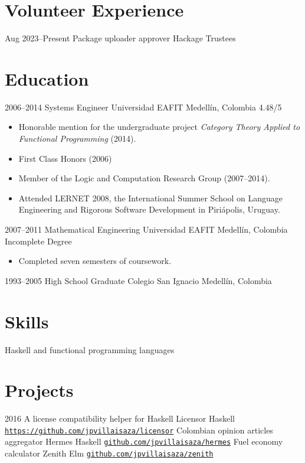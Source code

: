 \documentclass[letterpaper,sans,12pt]{moderncv}
\begin{document}
\section{Volunteer Experience}

\cventry
  {Aug 2023--Present}
  {Package uploader approver}
  {Hackage Trustees}
  {}
  {}
  {}

\section{Education}

\cventry
  {2006--2014}
  {Systems Engineer}
  {Universidad EAFIT}
  {Medellín, Colombia}
  {4.48/5}
  {
    \begin{itemize}
      \item
        Honorable mention for the undergraduate project \emph{Category
        Theory Applied to Functional Programming} (2014).
      \item
        First Class Honors (2006)
      \item
        Member of the Logic and Computation Research Group
        (2007--2014).
      \item
        Attended LERNET 2008, the International Summer School on
        Language Engineering and Rigorous Software Development in
        Piriápolis, Uruguay.
    \end{itemize}
  }
\cventry
  {2007--2011}
  {Mathematical Engineering}
  {Universidad EAFIT}
  {Medellín, Colombia}
  {Incomplete Degree}
  {
    \begin{itemize}
    \item
      Completed seven semesters of coursework.
    \end{itemize}
  }
\cventry
  {1993--2005}
  {High School Graduate}
  {Colegio San Ignacio}
  {Medellín, Colombia}
  {}
  {}

\section{Skills}

  {Haskell and functional programming languages}

\section{Projects}

\cventry
  {2016}
  {A license compatibility helper for Haskell}
  {Licensor}
  {Haskell}
  {}
  {
    \href{https://github.com/jpvillaisaza/licensor}
    {\texttt{https://github.com/jpvillaisaza/licensor}}
  }
\cventry
  {}
  {Colombian opinion articles aggregator}
  {Hermes}
  {Haskell}
  {}
  {
    \href{https://github.com/jpvillaisaza/hermes}
      {\texttt{github.com/jpvillaisaza/hermes}}
  }
\cventry
  {}
  {Fuel economy calculator}
  {Zenith}
  {Elm}
  {}
  {
    \href{https://github.com/jpvillaisaza/zenith}
      {\texttt{github.com/jpvillaisaza/zenith}}
  }
\end{document}
